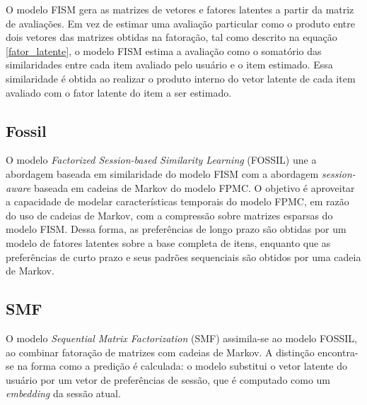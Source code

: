 O modelo FISM gera as matrizes de vetores e fatores latentes a partir da matriz
de avaliações. Em vez de estimar uma avaliação particular como o produto entre
dois vetores das matrizes obtidas na fatoração, tal como descrito na equação
\ref{fator_latente}, o modelo FISM estima a avaliação como o somatório das
similaridades entre cada item avaliado pelo usuário e o item estimado. Essa
similaridade é obtida ao realizar o produto interno do vetor latente de cada
item avaliado com o fator latente do item a ser estimado.

\subsection{Fossil}
O modelo \textit{Factorized Session-based Similarity Learning} (FOSSIL) une a
abordagem baseada em similaridade do modelo FISM com a abordagem
\textit{session-aware} baseada em cadeias de Markov do modelo FPMC. O objetivo é
aproveitar a capacidade de modelar características temporais do modelo FPMC, em
razão do uso de cadeias de Markov, com a compressão sobre matrizes esparsas do
modelo FISM. Dessa forma, as preferências de longo prazo são obtidas por um
modelo de fatores latentes sobre a base completa de itens, enquanto que as
preferências de curto prazo e seus padrões sequenciais são obtidos por uma
cadeia de Markov.

\subsection{SMF}
O modelo \textit{Sequential Matrix Factorization} (SMF) \cite{ludewig_2018} assimila-se
ao modelo FOSSIL, ao combinar fatoração de matrizes com cadeias de Markov. A distinção encontra-se
na forma como a predição é calculada: o modelo substitui o vetor latente do usuário por
um vetor de preferências de sessão, que é computado como um \textit{embedding} da sessão atual.


